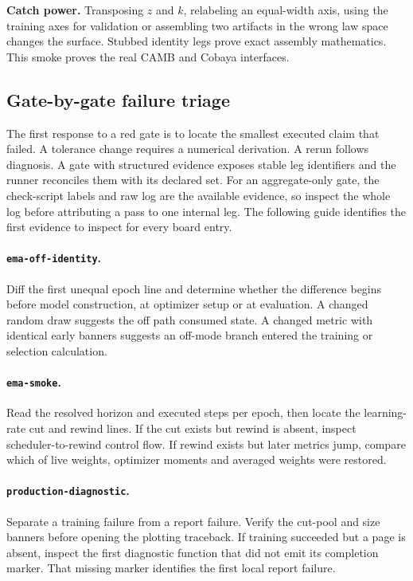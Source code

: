 \documentclass[10pt,aps,prd,twocolumn,nofootinbib]{revtex4-2}
\newcommand{\code}[1]{\texttt{#1}}
\begin{document}
\textbf{Catch power.}  Transposing \(z\) and \(k\), relabeling an equal-width
axis, using the training axes for validation or assembling two artifacts in
the wrong law space changes the surface.  Stubbed identity legs prove exact
assembly mathematics.  This smoke proves the real CAMB and Cobaya interfaces.

\subsection{Gate-by-gate failure triage}

The first response to a red gate is to locate the smallest executed claim that
failed.  A tolerance change requires a numerical derivation.  A rerun follows
diagnosis.  A gate with structured evidence exposes stable leg identifiers and
the runner reconciles them with its declared set.  For an aggregate-only gate,
the check-script labels and raw log are the available evidence, so inspect the
whole log before attributing a pass to one internal leg.  The following guide
identifies the first evidence to inspect for every board entry.

\paragraph{\code{ema-off-identity}.}
Diff the first unequal epoch line and determine whether the difference begins
before model construction, at optimizer setup or at evaluation.  A changed
random draw suggests the off path consumed state.  A changed metric with
identical early banners suggests an off-mode branch entered the training or
selection calculation.

\paragraph{\code{ema-smoke}.}
Read the resolved horizon and executed steps per epoch, then locate the
learning-rate cut and rewind lines.  If the cut exists but rewind is absent,
inspect scheduler-to-rewind control flow.  If rewind exists but later metrics
jump, compare which of live weights, optimizer moments and averaged weights
were restored.

\paragraph{\code{production-diagnostic}.}
Separate a training failure from a report failure.  Verify the cut-pool and
size banners before opening the plotting traceback.  If training succeeded
but a page is absent, inspect the first diagnostic function that did not emit
its completion marker.  That missing marker identifies the first local report
failure.
\end{document}
